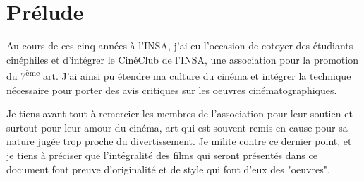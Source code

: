 \section{Prélude}

Au cours de ces cinq années à l'INSA, j'ai eu l'occasion de cotoyer des
étudiants cinéphiles et d'intégrer le CinéClub de l'INSA, une association pour
la promotion du 7\textsuperscript{ème} art. J'ai ainsi pu étendre ma culture du
cinéma et intégrer la technique nécessaire pour porter des avis critiques sur
les oeuvres cinématographiques.

Je tiens avant tout à remercier les membres de l'association pour leur soutien
et surtout pour leur amour du cinéma, art qui est souvent remis en cause pour
sa nature jugée trop proche du divertissement.  Je milite contre ce dernier
point, et je tiens à préciser que l'intégralité des films qui seront présentés
dans ce document font preuve d'originalité et de style qui font d'eux des
"oeuvres".
